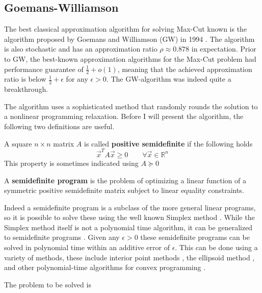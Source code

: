 \subsection{Goemans-Williamson}
The best classical approximation algorithm for solving Max-Cut known is the algorithm proposed by Goemans and Williamson (GW) in 1994 \cite{GW95}. The algorithm is also stochastic and has an approximation ratio $\rho \approx 0.878$ in expectation. Prior to GW, the best-known approximation algorithms for the Max-Cut problem had performance guarantee of $\frac{1}{2} + o(1)$, meaning that the achieved approximation ratio is below $\frac{1}{2} + \epsilon$ for any $\epsilon>0$. The GW-algorithm was indeed quite a breakthrough. 

The algorithm uses a sophisticated method that randomly rounds the solution to a nonlinear programming relaxation. Before I will present the algorithm, the following two definitions are useful.

\begin{definition}
	A square $n \times n$ matrix $A$ is called \textbf{positive semidefinite} if the following holds
	\begin{equation}
	\vec{x}^TA \vec{x} \geq 0 \qquad \forall \vec{x} \in \mathbb{R}^n
	\end{equation} 
	This property is sometimes indicated using $A \succcurlyeq 0$
\end{definition} 

\begin{definition}
	 A \textbf{semidefinite program} is the problem of optimizing a
	linear function of a symmetric positive semidefinite matrix subject to linear equality constraints.
\end{definition}
Indeed a semidefinite program is a subclass of the more general linear programs, so it is possible to solve these using the well known Simplex method \cite{simplex}. While the Simplex method itself is not a polynomial time algorithm, it can be generalized to semidefinite programs \cite{pataki}. Given any $\epsilon >0$ these semidefinite programs can be solved in polynomial time within an additive error of $\epsilon$. This can be done using a variety of methods, these include interior point methods \cite{nesterov1994interior}, the ellipsoid method \cite{lovasz1988geometric}, and other polynomial-time algorithms for convex programming \cite{vaidya}.

The problem to be solved is

